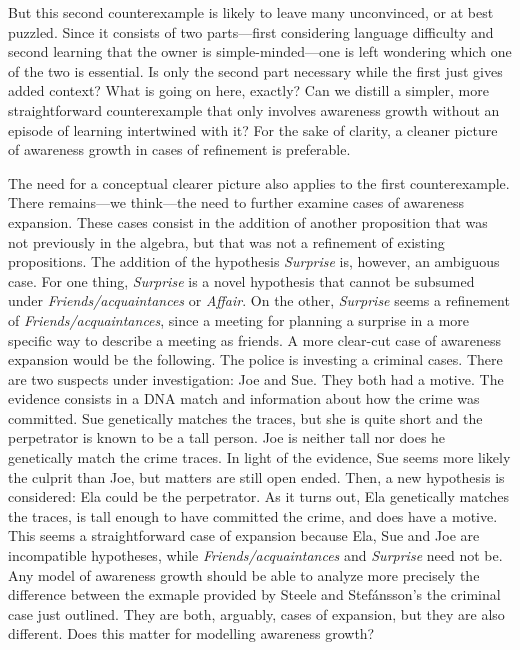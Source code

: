 \documentclass[
  11pt,
  dvipsnames,enabledeprecatedfontcommands]{scrartcl}
\begin{document}
But this second counterexample is likely to leave many unconvinced, or
at best puzzled. Since it consists of two parts---first considering
language difficulty and second learning that the owner is
simple-minded---one is left wondering which one of the two is essential.
Is only the second part necessary while the first just gives added
context? What is going on here, exactly? Can we distill a simpler, more
straightforward counterexample that only involves awareness growth
without an episode of learning intertwined with it? For the sake of
clarity, a cleaner picture of awareness growth in cases of refinement is
preferable.

The need for a conceptual clearer picture also applies to the first
counterexample. There remains---we think---the need to further examine
cases of awareness expansion. These cases consist in the addition of
another proposition that was not previously in the algebra, but that was
not a refinement of existing propositions. The addition of the
hypothesis \textit{Surprise} is, however, an ambiguous case. For one
thing, \textit{Surprise} is a novel hypothesis that cannot be subsumed
under \textit{Friends/acquaintances} or \textit{Affair}. On the other,
\textit{Surprise} seems a refinement of \textit{Friends/acquaintances},
since a meeting for planning a surprise in a more specific way to
describe a meeting as friends. A more clear-cut case of awareness
expansion would be the following. The police is investing a criminal
cases. There are two suspects under investigation: Joe and Sue. They
both had a motive. The evidence consists in a DNA match and information
about how the crime was committed. Sue genetically matches the traces,
but she is quite short and the perpetrator is known to be a tall person.
Joe is neither tall nor does he genetically match the crime traces. In
light of the evidence, Sue seems more likely the culprit than Joe, but
matters are still open ended. Then, a new hypothesis is considered: Ela
could be the perpetrator. As it turns out, Ela genetically matches the
traces, is tall enough to have committed the crime, and does have a
motive. This seems a straightforward case of expansion because Ela, Sue
and Joe are incompatible hypotheses, while
\textit{Friends/acquaintances} and \textit{Surprise} need not be. Any
model of awareness growth should be able to analyze more precisely the
difference between the exmaple provided by Steele and Stefánsson's the
criminal case just outlined. They are both, arguably, cases of
expansion, but they are also different. Does this matter for modelling
awareness growth?
\end{document}
